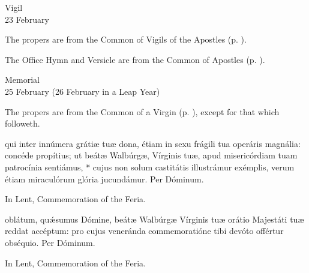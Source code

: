 \begin{inhead}
    {Vigil\\
23 February}
\end{inhead}

\begin{rubric}
	The propers are from the Common of Vigils of the Apostles (p. \pageref{CommonVigilApostles}).
\end{rubric}



\begin{rubric}
	The Office Hymn and Versicle are from the Common of Apostles (p. \pageref{CommonApostles}).
\end{rubric}

\begin{inhead}
    {Memorial\\
25 February (26 February in a Leap Year)}
\end{inhead}

\begin{rubric}
	The propers are from the Common of a Virgin (p. \pageref{CommonVirginOnlyI}), except for that which followeth.
\end{rubric}

\collect
{} qui inter innúmera gráti{\ae} tu{\ae} dona, étiam in sexu frágili tua operáris magnália: {\dag} concéde propítius; ut beát{\ae} Walbúrg{\ae}, Vírginis tu{\ae}, apud misericórdiam tuam patrocínia sentiámus, * cujus non solum castitátis illustrámur exémplis, verum étiam miraculórum glória jucundámur. Per Dóminum.

\begin{rubric}
	In Lent, Commemoration of the Feria.
\end{rubric}

\secret
{} oblátum, quǽsumus Dómine, beát{\ae} Walbúrg{\ae} Vírginis tu{\ae} orátio Majestáti tu{\ae} reddat accéptum: pro cujus veneránda commemoratióne tibi devóto offértur obséquio. Per Dóminum.

\begin{rubric}
	In Lent, Commemoration of the Feria.
\end{rubric}

